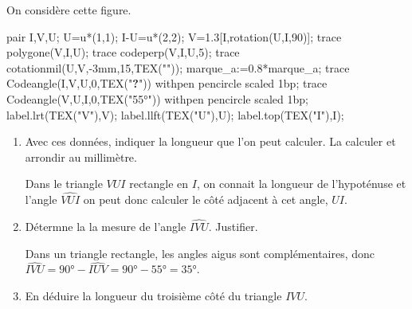     On considère cette figure.

    \begin{Geometrie}
        pair I,V,U;
        U=u*(1,1);
        I-U=u*(2,2);
        V=1.3[I,rotation(U,I,90)];
        trace polygone(V,I,U);
        trace codeperp(V,I,U,5);
        trace cotationmil(U,V,-3mm,15,TEX(""));
        marque_a:=0.8*marque_a;
        trace Codeangle(I,V,U,0,TEX("\textbf{?}")) withpen pencircle scaled 1bp;
        trace Codeangle(V,U,I,0,TEX("\ang{55}")) withpen pencircle scaled 1bp;
        label.lrt(TEX("V"),V);
        label.llft(TEX("U"),U);
        label.top(TEX("I"),I);
    \end{Geometrie}

    \begin{enumerate}
        \item Avec ces données, indiquer la longueur que l'on peut calculer. La calculer et arrondir au millimètre.

        {\color{red}Dans le triangle $VUI$ rectangle en $I$, on connait la longueur de l'hypoténuse et l'angle $\widehat{VUI}$ on peut donc calculer le côté adjacent à cet angle, $UI$.

        }
        \item Détermne la la mesure de l'angle $\widehat{IVU}$. Justifier.

        {\color{red} Dans un triangle rectangle, les angles aigus sont complémentaires, donc $\widehat{IVU}=\ang{90}-\widehat{IUV}=\ang{90}-\ang{55}=\ang{35}$.}
        \item En déduire la longueur du troisième côté du triangle $IVU$.

        {\color{red}}
    \end{enumerate}
